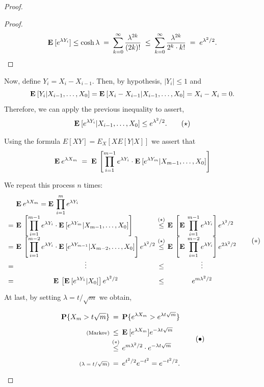 \begin{proof}
\begin{proof}
    \[
        \mathbf{E}\:[e^{\lambda Y_i}]\leq \cosh \lambda \;=\; \sum_{k = 0}^\infty \frac{\lambda^{2k}}{(2k)!} \;\leq\; \sum_{k = 0}^\infty \frac{\lambda^{2k}}{2^k \cdot k!} \;=\; e^{\lambda^2 / 2}.
    \]

    \end{proof}

    Now, define $Y_i = X_i - X_{i-1}$. Then, by hypothesis, $|Y_i| \leq 1$ and
    \[ \mathbf{E}\: [Y_i | X_{i-1},\ldots, X_0] = \mathbf{E}\: [X_i - X_{i-1} | X_{i-1},\ldots, X_0] = X_i - X_i = 0. \] 
    Therefore, we can apply the previous inequality to assert,
    \[ \mathbf{E}\: [e^{\lambda Y_i} | X_{i-1},\ldots, X_0] \leq e^{\lambda^2/2}. \tag*{$ (\star) $}\]

    Using the formula $E[XY] = E_X [X E[Y|X]]$ we assert that
    \[ \mathbf{E}\: e^{\lambda X_m} \; = \;  \mathbf{E}\:\left[\prod_{i = 1}^{m-1} e^{\lambda Y_i} \cdot \mathbf{E}\:[e^{\lambda Y_m} | X_{m-1},\ldots, X_0]\right] \]

    We repeat this process $n$ times:
    \[ \everymath{\displaystyle}\arraycolsep=1.8pt\def\arraystretch{1.8}
        \begin{array}{r c c c l}
        & & \E e^{\lambda X_m}  =   \E \prod_{i = 1}^{m} e^{\lambda Y_i} \hfill\\
        & = & \E\left[\prod_{i = 1}^{m-1} e^{\lambda Y_i} \cdot \E[e^{\lambda Y_m} | X_{m-1},\ldots, X_0]\right] \hfill & \overset{(\star)}{\leq} & \E\left[\E \prod_{i = 1}^{m-1} e^{\lambda Y_i} \right] e^{\lambda^2 / 2}\\
        & = & \E\left[\prod_{i = 1}^{m-2} e^{\lambda Y_i} \cdot \E[e^{\lambda Y_{m-1}} | X_{m-2},\ldots, X_0]\right]e^{\lambda^2 / 2} & \overset{(\star)}{\leq} & \E\left[\E \prod_{i = 1}^{m-2} e^{\lambda Y_i} \right] e^{2\lambda^2 / 2}\\
        & = & \hfill\vdots\hfill & \leq & \hfill\vdots\hfill\\
        & = & \E\left[\E[e^{\lambda Y_{1}} |  X_0]\right]e^{\lambda^2 / 2} & \leq & \hfill e^{m\lambda^2/2} \hfill
    \end{array} \tag*{$ (*) $} \]
    At last, by setting $\lambda = t/\sqrt{m}$ we obtain,
    \[ \everymath{\displaystyle}\arraycolsep=1.8pt\def\arraystretch{1.8}
    \begin{array}{r c l}
        \P\{X_m > t\sqrt{m}\} & = & \P\{e^{\lambda X_m} > e^{\lambda t \sqrt{m}}\} \\
        \text{\scriptsize (Markov)}& \leq & \E[e^{\lambda X_m} ] e^{-\lambda t \sqrt{m}}\\
        & \overset{(*)}{\leq} & e^{m\lambda^2/2} \cdot e^{-\lambda t \sqrt{m}}\\
        \text{\scriptsize ($\lambda = t/\sqrt{m}$)} & = & e^{t^2/2} e^{-t^2} = e^{-t^2 / 2}.
    \end{array}    \tag*{$ (\bullet) $}
    \]
\end{proof}

